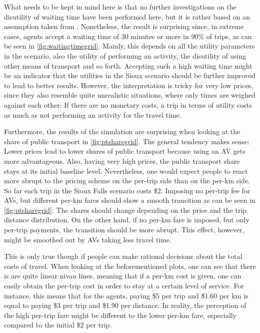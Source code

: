 What needs to be kept in mind here is that no further investigations on the
disutility of waiting time have been performed here, but it is rather based on an
assumption taken from \citet{Chakirov2014}. Nonetheless, the result is surprising
since, in extreme cases, agents accept a waiting time of 30 minutes or more in
90\% of trips, as can be seen in \cref{fig:waitingtimegrid}. Mainly, this depends
on all the utility parameters in the scenario, also the utility of performing an
activity, the disutility of using other means of transport and so forth. Accepting
such a high waiting time might be an indicator that the utilities in the Sioux
scenario should be further improved to lead to better results. However, the interpretation
is tricky for very low prices, since they also resemble quite unrealistic situations, where
only times are weighed against each other: If there are no monetary costs, a trip
in terms of utility costs as much as not performing an activity for the travel time.

Furthermore, the results of the simulation are surprising when looking at the share
of public transport in \cref{fig:ptsharegrid}. The general tendency makes
sense: Lower prices lead to lower shares of public transport because using an AV
gets more advantageous. Also, having very high prices, the public transport share
stays at its initial baseline level. Nevertheless, one would expect people to
react more abrupt to the pricing scheme on the per-trip side than on the per-km
side. So far each trip in the Sioux Falls scenario costs \$2. Imposing no per-trip
fee for AVs, but different per-km fares should show a smooth transition as can be seen
in \cref{fig:ptsharegrid}: The shares
should change depending on the price and the trip distance distribution.
On the other hand, if no per-km fare is imposed, but only per-trip payments, the
transition should be more abrupt. This effect, however, might be smoothed out by
AVs taking less travel time.

This is only true though if people can make rational decisions about the
total costs of travel. When looking at the beforementioned plots, one can see
that there is are quite linear nivau lines, meaning that if a per-km cost is given,
one can easily obtain the per-trip cost in order to stay at a certain level of
service. For instance, this means that for the agents, paying \$5 per trip and
\$1.60 per km is equal to paying \$3 per trip and \$1.90 per distance. In reality, the perception of the high per-trip fare might be different to the lower
per-km fare, especially compared to the initial \$2 per trip.

